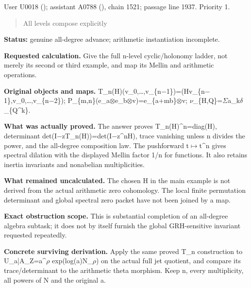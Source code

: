 User U0018 (\protect{});
assistant A0788 (\protect{}),
chain 1521; passage line 1937. Priority 1.

\begin{quote}
All levels compose explicitly
\end{quote}

\textbf{Status:} genuine all-degree advance; arithmetic instantiation
incomplete.

\textbf{Requested calculation.} Give the full n-level cyclic/holonomy
ladder, not merely its second or third example, and map its Mellin and
arithmetic operations.

\textbf{Original objects and maps.}
T\_n(H)(v\_0,…,v\_\{n\allowbreak{}\ensuremath{−}\allowbreak{}1\})=(Hv\_\{n\allowbreak{}\ensuremath{−}\allowbreak{}1\},v\_0,…,v\_\{n\allowbreak{}\ensuremath{−}\allowbreak{}2\});
P\_\{m,n\}(e\_a\allowbreak{}\ensuremath{⊗}\allowbreak{}e\_b\allowbreak{}\ensuremath{⊗}\allowbreak{}v)=e\_\{a+mb\}\allowbreak{}\ensuremath{⊗}\allowbreak{}v;
\allowbreak{}\ensuremath{ν}\allowbreak{}\_\{H,Q\}=\allowbreak{}\ensuremath{Σ}\allowbreak{}a\_k\allowbreak{}\ensuremath{δ}\allowbreak{}\_\{Q\textasciicircum{}k\}.

\textbf{What was actually proved.} The answer proves
T\_n(H)\^{}n=diag(H), determinant
det(I\allowbreak{}\ensuremath{−}\allowbreak{}zT\_n(H))=det(I\allowbreak{}\ensuremath{−}\allowbreak{}z\textasciicircum{}nH),
trace vanishing unless n divides the power, and the all-degree
composition law. The pushforward
t\allowbreak{}\ensuremath{↦}\allowbreak{}t\textasciicircum{}n gives
spectral dilation with the displayed Mellin factor 1/n for functions. It
also retains inertia invariants and nonabelian multiplicities.

\textbf{What remained uncalculated.} The chosen H in the main example is
not derived from the actual arithmetic zero cohomology. The local finite
permutation determinant and global spectral zero packet have not been
joined by a map.

\textbf{Exact obstruction scope.} This is substantial completion of an
all-degree algebra subtask; it does not by itself furnish the global
GRH-sensitive invariant requested repeatedly.

\textbf{Concrete surviving derivation.} Apply the same proved T\_n
construction to
U\_a|A\_Z=a\textasciicircum{}\allowbreak{}\ensuremath{ρ}\allowbreak{}
exp(log(a)N\_\allowbreak{}\ensuremath{ρ}\allowbreak{}) on the actual
full jet quotient, and compare its trace/determinant to the arithmetic
theta morphism. Keep n, every multiplicity, all powers of N and the
original a.


